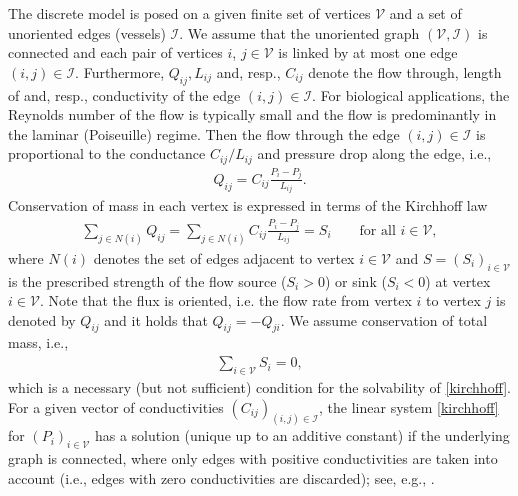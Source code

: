 \documentclass{article}
\numberwithin{equation}{section}
\begin{document}
The discrete model is posed on a given finite set of vertices $\mathcal{V}$ and a set of unoriented edges (vessels)  $\mathcal{I}$.
We assume that the unoriented graph $(\mathcal{V},\mathcal{I})$ is connected and each pair of vertices $i$, $j\in\mathcal{V}$ is linked by at most one edge $(i,j)\in\mathcal{I}$.
Furthermore, $Q_{ij}, L_{ij}$ and, resp., $C_{ij}$ denote the flow through, length of and, resp., conductivity
of the edge $(i,j)\in \mathcal{I}$.
For biological applications, the Reynolds number of the flow is typically small and the flow is predominantly in the laminar (Poiseuille) regime.
Then the flow through the edge $(i,j)\in \mathcal{I}$ is proportional to the conductance $C_{ij}/L_{ij}$ and pressure drop along the edge, i.e.,
\begin{align}\label{flux}
   Q_{ij} = C_{ij} \frac{P_i-P_j}{L_{ij}}.
\end{align}
Conservation of mass in each vertex is expressed in terms of the Kirchhoff law
\begin{align}\label{kirchhoff}
    \sum_{j\in N(i)} Q_{ij} =  \sum_{j\in N(i)} C_{ij} \frac{P_i-P_j}{L_{ij}} = S_i \qquad \text{for all } i\in \mathcal{V},
\end{align}
where $N(i)$ denotes the set of edges adjacent to vertex $i\in\mathcal{V}$
and $S=(S_i)_{i\in\mathcal{V}}$ is the prescribed strength of the flow source ($S_i>0$) or sink ($S_i<0$)
at vertex $i\in\mathcal{V}$. Note that the flux is oriented, i.e. the flow rate from vertex $i$ to vertex $j$ is denoted by $Q_{ij}$ and it holds that $Q_{ij} =-Q_{ji}$.
We assume conservation of total mass, i.e.,
\begin{align*}
   \sum_{i\in \mathcal{V}} S_i = 0,
\end{align*}
which is a necessary (but not sufficient) condition for the solvability of \eqref{kirchhoff}.
For a given vector of conductivities $(C_{ij})_{(i,j)\in \mathcal{I}}$, the linear system \eqref{kirchhoff} for $(P_i)_{i\in \mathcal{V}}$
has a solution (unique up to an additive constant) if the underlying graph is connected,
where only edges with positive conductivities are taken into account
(i.e., edges with zero conductivities are discarded); see, e.g., \cite{gross2013handbook}.
\end{document}
